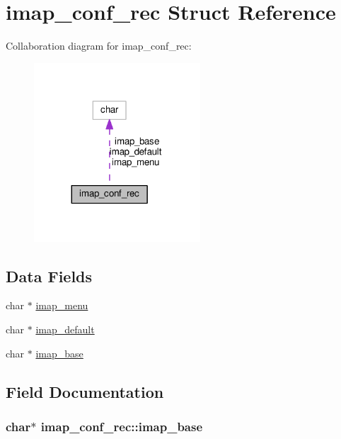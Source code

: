 \hypertarget{structimap__conf__rec}{}\section{imap\+\_\+conf\+\_\+rec Struct Reference}
\label{structimap__conf__rec}


Collaboration diagram for imap\+\_\+conf\+\_\+rec\+:
\nopagebreak
\begin{figure}[H]
\begin{center}
\leavevmode
\includegraphics[width=176pt]{structimap__conf__rec__coll__graph}
\end{center}
\end{figure}
\subsection*{Data Fields}
\begin{DoxyCompactItemize}
\item 
char $\ast$ \hyperlink{structimap__conf__rec_a2bb09b50b1db10c5ad7bceacf52b686c}{imap\+\_\+menu}
\item 
char $\ast$ \hyperlink{structimap__conf__rec_a36f60a144df71dd42f7b60b887ca6b4b}{imap\+\_\+default}
\item 
char $\ast$ \hyperlink{structimap__conf__rec_aa5260c5ac9f69bb0f8ed0cd6787eb0e7}{imap\+\_\+base}
\end{DoxyCompactItemize}


\subsection{Field Documentation}
\subsubsection[{\texorpdfstring{imap\+\_\+base}{imap_base}}]{\setlength{\rightskip}{0pt plus 5cm}char$\ast$ imap\+\_\+conf\+\_\+rec\+::imap\+\_\+base}\hypertarget{structimap__conf__rec_aa5260c5ac9f69bb0f8ed0cd6787eb0e7}{}\label{structimap__conf__rec_aa5260c5ac9f69bb0f8ed0cd6787eb0e7}
